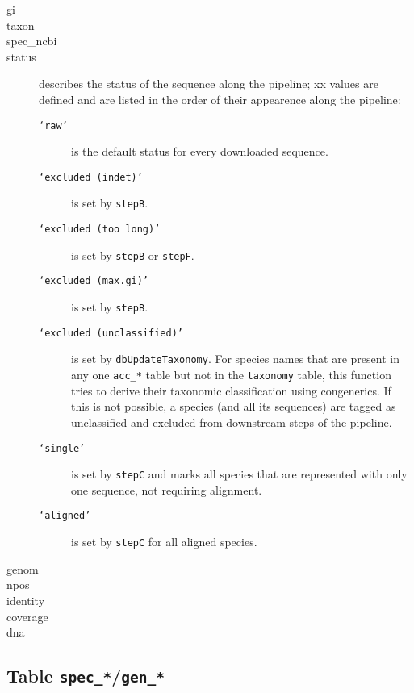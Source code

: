 \documentclass[12pt]{article}
\begin{document}
\begin{description}
\item[gi] 
\item[taxon] 
\item[spec\_ncbi] 
\item[status] describes the status of the sequence along the pipeline; xx values are defined and are listed in the order of their appearence along the pipeline:
	\begin{description}
	\item[\texttt{`raw'}] is the default status for every downloaded sequence.
	\item[\texttt{`excluded (indet)'}] is set by \texttt{stepB}.
	\item[\texttt{`excluded (too long)'}] is set by \texttt{stepB} or \texttt{stepF}.
	\item[\texttt{`excluded (max.gi)'}] is set by \texttt{stepB}.
	\item[\texttt{`excluded (unclassified)'}]  is set by \texttt{dbUpdateTaxonomy}. For species names that are present in any one \texttt{acc\_*} table but not in the \texttt{taxonomy} table, this function tries to derive their taxonomic classification using congenerics. If this is not possible, a species (and all its sequences) are tagged as unclassified and excluded from downstream steps of the pipeline.
	\item[\texttt{`single'}] is set by \texttt{stepC} and marks all species that are represented with only one sequence, not requiring alignment.
	\item[\texttt{`aligned'}] is set by \texttt{stepC} for all aligned species.
	\end{description}

\item[genom] 
\item[npos] 
\item[identity] 
\item[coverage] 
\item[dna]
\end{description}


\subsection{Table \texttt{spec\_*}/\texttt{gen\_*}}

\begin{description}
\item[ ] 
\end{description}
\end{document}
